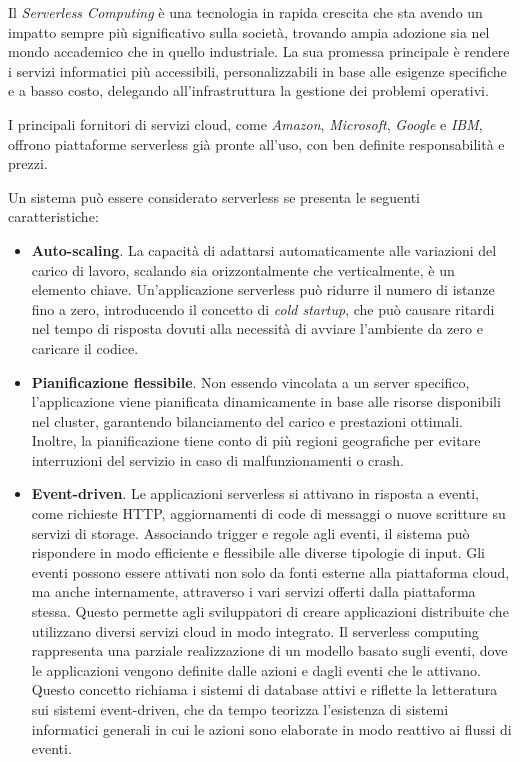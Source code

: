Il \textit{Serverless Computing} è una tecnologia in rapida crescita che sta avendo un impatto sempre più significativo sulla società, trovando ampia adozione sia nel mondo accademico che in quello industriale. La sua promessa principale è rendere i servizi informatici più accessibili, personalizzabili in base alle esigenze specifiche e a basso costo, delegando all'infrastruttura la gestione dei problemi operativi.

I principali fornitori di servizi cloud, come \textit{Amazon}, \textit{Microsoft}, \textit{Google} e \textit{IBM}, offrono piattaforme serverless già pronte all'uso, con ben definite responsabilità e prezzi.

Un sistema può essere considerato serverless se presenta le seguenti caratteristiche\cite{7979855}:
\begin{itemize}
    \item \textbf{Auto-scaling}. La capacità di adattarsi automaticamente alle variazioni del carico di lavoro, scalando sia orizzontalmente che verticalmente, è un elemento chiave. Un'applicazione serverless può ridurre il numero di istanze fino a zero, introducendo il concetto di \textit{cold startup}, che può causare ritardi nel tempo di risposta dovuti alla necessità di avviare l'ambiente da zero e caricare il codice.
    \item \textbf{Pianificazione flessibile}. Non essendo vincolata a un server specifico, l'applicazione viene pianificata dinamicamente in base alle risorse disponibili nel cluster, garantendo bilanciamento del carico e prestazioni ottimali. Inoltre, la pianificazione tiene conto di più regioni geografiche per evitare interruzioni del servizio in caso di malfunzionamenti o crash.
    \item \textbf{Event-driven}. Le applicazioni serverless si attivano in risposta a eventi, come richieste HTTP, aggiornamenti di code di messaggi o nuove scritture su servizi di storage. Associando trigger e regole agli eventi, il sistema può rispondere in modo efficiente e flessibile alle diverse tipologie di input. Gli eventi possono essere attivati non solo da fonti esterne alla piattaforma cloud, ma anche internamente, attraverso i vari servizi offerti dalla piattaforma stessa. Questo permette agli sviluppatori di creare applicazioni distribuite che utilizzano diversi servizi cloud in modo integrato. Il serverless computing rappresenta una parziale realizzazione di un modello basato sugli eventi, dove le applicazioni vengono definite dalle azioni e dagli eventi che le attivano. Questo concetto richiama i sistemi di database attivi e riflette la letteratura sui sistemi event-driven, che da tempo teorizza l'esistenza di sistemi informatici generali in cui le azioni sono elaborate in modo reattivo ai flussi di eventi.
    

\end{itemize}
